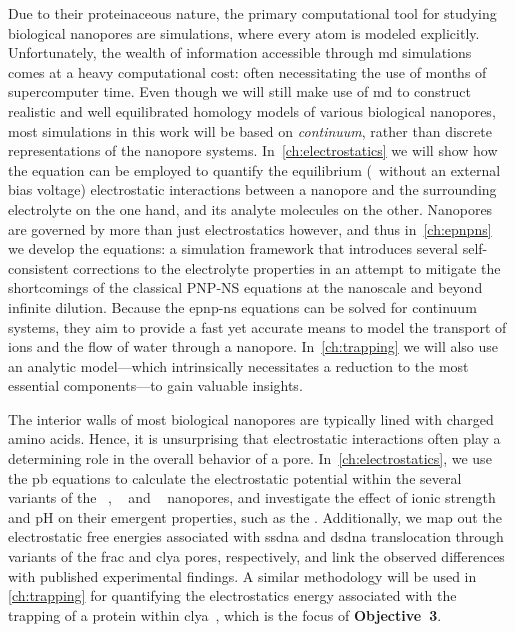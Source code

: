 Due to their proteinaceous nature, the primary computational tool for studying biological nanopores are
 simulations, where every atom is modeled explicitly. Unfortunately, the wealth of information
accessible through \gls{md} simulations comes at a heavy computational cost: often necessitating the use of
months of supercomputer time. Even though we will still make use of \gls{md} to construct realistic and well
equilibrated homology models of various biological nanopores, most simulations in this work will be based on
\emph{continuum}, rather than discrete representations of the nanopore systems. In~\cref{ch:electrostatics} we
will show how the  equation can be employed to quantify the equilibrium (\ie~without an external
bias voltage) electrostatic interactions between a nanopore and the surrounding electrolyte on the one hand,
and its analyte molecules on the other. Nanopores are governed by more than just electrostatics however, and
thus in~\cref{ch:epnpns} we develop the  equations: a simulation framework that introduces
several self-consistent corrections to the electrolyte properties in an attempt to mitigate the shortcomings
of the classical {PNP-NS} equations at the nanoscale and beyond infinite dilution. Because the \gls{epnp-ns}
equations can be solved for continuum systems, they aim to provide a fast yet accurate means to model the
transport of ions and the flow of water through a nanopore. In~\cref{ch:trapping} we will also use an analytic
model---which intrinsically necessitates a reduction to the most essential components---to gain valuable
insights.

%
%

The interior walls of most biological nanopores are typically lined with charged amino acids. Hence, it is
unsurprising that electrostatic interactions often play a determining role in the overall behavior of a pore.
In~\cref{ch:electrostatics}, we use the \gls{pb} equations to calculate the electrostatic potential within the
several variants of the ~\cite{Huang-2020}, ~\cite{Wloka-2016,Huang-2017} and
~\cite{Franceschini-2016} nanopores, and investigate the effect of ionic strength and pH on
their emergent properties, such as the . Additionally, we map out the electrostatic free
energies associated with \gls{ssdna} and \gls{dsdna} translocation through variants of the \gls{frac} and
\gls{clya} pores, respectively, and link the observed differences with published experimental findings. A
similar methodology will be used in \cref{ch:trapping} for quantifying the electrostatics energy associated
with the trapping of a protein within \gls{clya}~\cite{Soskine-Biesemans-2015}, which is the focus of
\textbf{Objective~3}.


